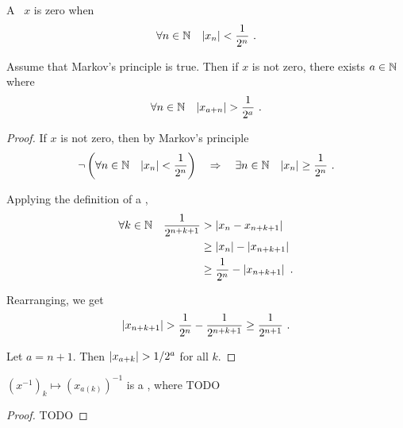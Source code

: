 \documentclass[leqno]{report}
\begin{document}
\begin{Definition}[Zero]
    A \FCCS \ $x$ is zero when
    \[ \forall {n \in \mathbb{N}} \quad {\left| x_n \right| < \frac{1}{2^n}} \ . \]
\end{Definition}

\begin{Lemma}[Apartness]
    Assume that Markov's principle is true. Then if $x$ is not zero, there exists $a \in \mathbb{N}$ where
    \[ \forall {n \in \mathbb{N}} \quad {\left| x_{a+n} \right| > \frac{1}{2^a}} \ . \]
\end{Lemma}

\begin{proof}
    If $x$ is not zero, then by Markov's principle
    \[
        \neg \left( \forall {n \in \mathbb{N}} \quad {\left| x_n \right| < \frac{1}{2^n}} \right)
        \quad \Rightarrow \quad
        \exists {n \in \mathbb{N}} \quad {\left| x_n \right| \geq \frac{1}{2^n}} \ .
    \]

    Applying the definition of a \FCCS,
    \begin{align*}
        \forall {k \in \mathbb{N}} \quad {\frac{1}{2^{n+k+1}}}
        &> \left| x_n - x_{n+k+1} \right| \\
        &\geq \left| x_n \right| - \left| x_{n+k+1} \right| \\
        &\geq \frac{1}{2^n} - \left| x_{n+k+1} \right| \ .
    \end{align*}

    Rearranging, we get
    \[
        \left| x_{n+k+1} \right|
        > \frac{1}{2^n} - \frac{1}{2^{n+k+1}}
        \geq \frac{1}{2^{n+1}} \ .
    \]

    Let $a = n + 1$. Then $\left| x_{a+k} \right| > 1/2^a$ for all $k$.
\end{proof}

\begin{Proposition}[Reciprocal]
    $\left(x^{-1}\right)_k \mapsto \left(x_{a(k)}\right)^{-1}$ is a \FCCS, where TODO
\end{Proposition}

\begin{proof}
    TODO
\end{proof}



\end{document}
